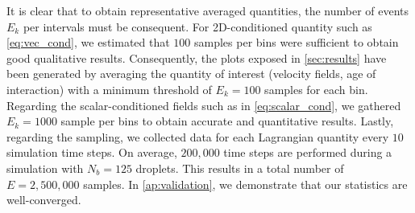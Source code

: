 It is clear that to obtain representative averaged quantities, the number of events $E_k$ per intervals must be consequent. 
For 2D-conditioned quantity such as \ref{eq:vec_cond}, we estimated that $100$ samples per bins were sufficient to obtain good qualitative results. 
Consequently, the plots exposed in \ref{sec:results} have been generated by averaging the quantity of interest (velocity fields, age of interaction) with a minimum threshold of $E_k = 100$ samples for each bin.
Regarding the scalar-conditioned fields such as in \ref{eq:scalar_cond}, we gathered $E_k = 1000$ sample per bins to obtain accurate and quantitative results. 
Lastly, regarding the sampling, we collected data for each Lagrangian quantity every $10$ simulation time steps.
On average, $200,000$ time steps are performed during a simulation with $N_b = 125$ droplets. 
This results in a total number of $E = 2,500,000$ samples. 
In \ref{ap:validation}, we demonstrate that our statistics are well-converged.

